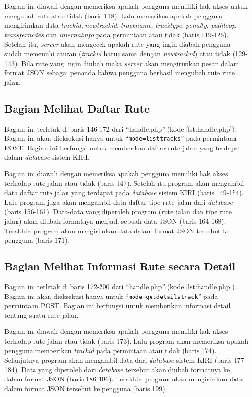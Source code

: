 Bagian ini diawali dengan memeriksa apakah pengguna memiliki hak akses untuk mengubah rute atau tidak (baris 118). Lalu memeriksa apakah pengguna mengirimkan data \textit{trackid}, \textit{newtrackid}, \textit{trackname}, \textit{tracktype}, \textit{penalty}, \textit{pathloop}, \textit{transfernodes}  dan \textit{internalinfo} pada permintaan atau tidak (baris 119-126). Setelah itu, \textit{server} akan mengecek apakah rute yang ingin diubah pengguna sudah memenuhi aturan (\textit{trackid} harus sama dengan \textit{newtrackid}) atau tidak (129-143). Bila rute yang ingin diubah maka \textit{server} akan mengirimkan pesan dalam format JSON sebagai penanda bahwa pengguna berhasil mengubah rute rute jalan.

\subsection{Bagian Melihat Daftar Rute}
\label{sec:melihatdaftarrute}
Bagian ini terletak di baris 146-172 dari ``handle.php'' (kode \ref{lst:handle.php}). Bagian ini akan dieksekusi hanya untuk ``\texttt{mode=listtracks}'' pada permintaan POST. Bagian ini berfungsi untuk memberikan daftar rute jalan yang terdapat dalam \textit{database} sistem KIRI.

Bagian ini diawali dengan memeriksa apakah pengguna memiliki hak akses terhadap rute jalan atau tidak (baris 147). Setelah itu program akan mengambil data daftar rute jalan yang terdapat pada \textit{database} sistem KIRI (baris 149-154). Lalu program juga akan mengambil data daftar tipe rute jalan dari \textit{database} (baris 156-161). Data-data yang diperoleh program (rute jalan dan tipe rute jalan) akan diubah formatnya menjadi sebuah data JSON (baris 164-168). Terakhir, program akan mengirimkan data dalam format JSON tersebut ke pengguna (baris 171).

\subsection{Bagian Melihat Informasi Rute secara Detail}
\label{sec:melihatdaftarrutedetail}
Bagian ini terletak di baris 172-200 dari ``handle.php'' (kode \ref{lst:handle.php}). Bagian ini akan dieksekusi hanya untuk ``\texttt{mode=getdetailstrack}'' pada permintaan POST. Bagian ini berfungsi untuk memberikan informasi detail tentang suatu rute jalan.

Bagian ini diawali dengan memeriksa apakah pengguna memiliki hak akses terhadap rute jalan atau tidak (baris 173). Lalu program akan memeriksa apakah pengguna memberikan \textit{trackid} pada permintaan atau tidak (baris 174). Selanjutnya program akan mengambil data dari \textit{database} sistem KIRI (baris 177-184). Data yang diperoleh dari \textit{database} tersebut akan diubah formatnya ke dalam format JSON (baris 186-196). Terakhir, program akan mengirimkan data dalam format JSON tersebut ke pengguna (baris 199).


